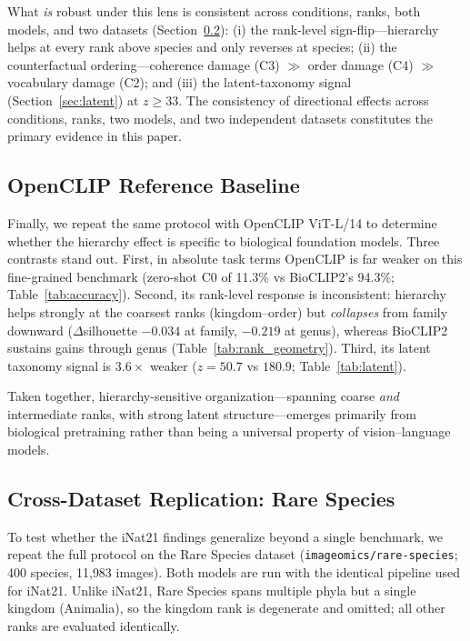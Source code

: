 What \emph{is} robust under this lens is consistent across conditions, ranks, both
models, and two datasets (Section~\ref{sec:rare}): (i) the rank-level
sign-flip---hierarchy helps at every rank above species and only reverses at
species; (ii) the counterfactual ordering---coherence damage (C3) $\gg$ order
damage (C4) $\gg$ vocabulary damage (C2); and (iii) the latent-taxonomy signal
(Section~\ref{sec:latent}) at $z \ge 33$. The consistency of directional effects
across conditions, ranks, two models, and two independent datasets constitutes the
primary evidence in this paper.

\subsection{OpenCLIP Reference Baseline}
\label{sec:openclip}

Finally, we repeat the same protocol with OpenCLIP ViT-L/14 to determine whether the
hierarchy effect is specific to biological foundation models. Three contrasts stand
out. First, in absolute task terms OpenCLIP is far weaker on this fine-grained
benchmark (zero-shot C0 of 11.3\% vs BioCLIP2's 94.3\%; Table~\ref{tab:accuracy}).
Second, its rank-level response is inconsistent: hierarchy helps strongly at the
coarsest ranks (kingdom--order) but \emph{collapses} from family downward
($\Delta$silhouette $-0.034$ at family, $-0.219$ at genus), whereas BioCLIP2
sustains gains through genus (Table~\ref{tab:rank_geometry}). Third, its latent
taxonomy signal is $3.6\times$ weaker ($z = 50.7$ vs $180.9$;
Table~\ref{tab:latent}).

Taken together, hierarchy-sensitive organization---spanning coarse \emph{and}
intermediate ranks, with strong latent structure---emerges primarily from biological
pretraining rather than being a universal property of vision--language models.

\subsection{Cross-Dataset Replication: Rare Species}
\label{sec:rare}

To test whether the iNat21 findings generalize beyond a single benchmark, we repeat
the full protocol on the Rare Species dataset (\texttt{imageomics/rare-species};
400 species, 11{,}983 images). Both models are run with the identical pipeline used
for iNat21. Unlike iNat21, Rare Species spans multiple phyla but a single kingdom
(Animalia), so the kingdom rank is degenerate and omitted; all other ranks are
evaluated identically.

